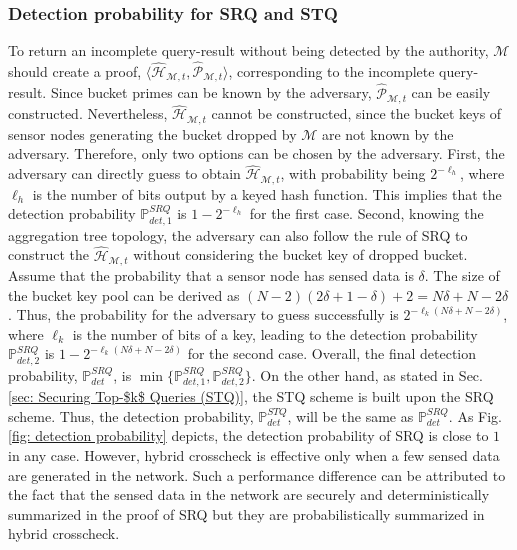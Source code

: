 \documentclass[conference]{IEEEtran}
\begin{document}
\subsubsection{Detection probability for SRQ and STQ}\label{sec: Detection probability of SRQ and STQ}
To return an incomplete query-result without being detected by the authority, $\mathcal{M}$ should create a proof, $\langle\widehat{\mathcal{H}}_{\mathcal{M},t},\widehat{\mathcal{P}}_{\mathcal{M},t}\rangle$, corresponding to the incomplete query-result. Since bucket primes can be known by the adversary, $\widehat{\mathcal{P}}_{\mathcal{M},t}$ can be easily constructed. Nevertheless, $\widehat{\mathcal{H}}_{\mathcal{M},t}$ cannot be constructed, since the bucket keys of sensor nodes generating the bucket dropped by $\mathcal{M}$ are not known by the adversary. Therefore, only two options can be chosen by the adversary. First, the adversary can directly guess to obtain $\widehat{\mathcal{H}}_{\mathcal{M},t}$, with probability being $2^{-\ell_h}$, where $\ell_h$ is the number of bits output by a keyed hash function. This implies that the detection probability $\mathbb{P}_{det,1}^{SRQ}$ is $1-2^{-\ell_h}$ for the first case. Second, knowing the aggregation tree topology, the adversary can also follow the rule of SRQ to construct the $\widehat{\mathcal{H}}_{\mathcal{M},t}$ without considering the bucket key of dropped bucket. Assume that the probability that a sensor node has sensed data is $\delta$. The size of the bucket key pool can be derived as $(N-2)(2\delta+1-\delta)+2=N\delta+N-2\delta$. Thus, the probability for the adversary to guess successfully is $2^{-\ell_k(N\delta+N-2\delta)}$, where $\ell_k$ is the number of bits of a key, leading to the detection probability $\mathbb{P}_{det,2}^{SRQ}$ is $1-2^{-\ell_k(N\delta+N-2\delta)}$ for the second case. Overall, the final detection probability, $\mathbb{P}_{det}^{SRQ}$, is $\min\{\mathbb{P}_{det,1}^{SRQ},\mathbb{P}_{det,2}^{SRQ}\}$. On the other hand, as stated in Sec. \ref{sec: Securing Top-$k$ Queries (STQ)}, the STQ scheme is built upon the SRQ scheme. Thus, the detection probability, $\mathbb{P}_{det}^{STQ}$, will be the same as $\mathbb{P}_{det}^{SRQ}$. As Fig. \ref{fig: detection probability} depicts, the detection probability of SRQ is close to $1$ in any case. However, hybrid crosscheck is effective only when a few sensed data are generated in the network. Such a performance difference can be attributed to the fact that the sensed data in the network are securely and deterministically summarized in the proof of SRQ but they are probabilistically summarized in hybrid crosscheck.
\end{document}

